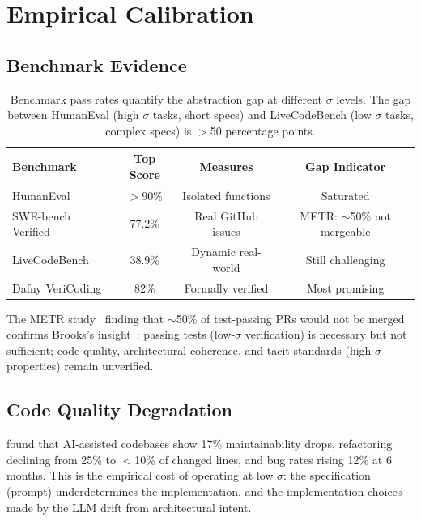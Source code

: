 \documentclass[11pt, a4paper, logo, copyright]{googledeepmind}
\begin{document}
\section{Empirical Calibration}
\label{sec:empirical}

\subsection{Benchmark Evidence}

\begin{table}[H]
\centering
\small
\begin{tabular}{lccc}
\toprule
\textbf{Benchmark} & \textbf{Top Score} & \textbf{Measures} & \textbf{Gap Indicator} \\
\midrule
HumanEval & $>$90\% & Isolated functions & Saturated \\
SWE-bench Verified & 77.2\% & Real GitHub issues & METR: $\sim$50\% not mergeable \\
LiveCodeBench & 38.9\% & Dynamic real-world & Still challenging \\
Dafny VeriCoding & 82\% & Formally verified & Most promising \\
\bottomrule
\end{tabular}
\caption{Benchmark pass rates quantify the abstraction gap at different $\sigma$ levels. The gap between HumanEval (high $\sigma$ tasks, short specs) and LiveCodeBench (low $\sigma$ tasks, complex specs) is $>$50 percentage points.}
\label{tab:benchmarks}
\end{table}

The METR study~\citep{metr2026swebench} finding that $\sim$50\% of test-passing PRs would not be merged confirms Brooks's insight~\citep{brooks1987nosilver}: passing tests (low-$\sigma$ verification) is necessary but not sufficient; code quality, architectural coherence, and tacit standards (high-$\sigma$ properties) remain unverified.

\subsection{Code Quality Degradation}

\citet{gitclear2025quality} found that AI-assisted codebases show 17\% maintainability drops, refactoring declining from 25\% to $<$10\% of changed lines, and bug rates rising 12\% at 6 months. This is the empirical cost of operating at low $\sigma$: the specification (prompt) underdetermines the implementation, and the implementation choices made by the LLM drift from architectural intent.
\end{document}
